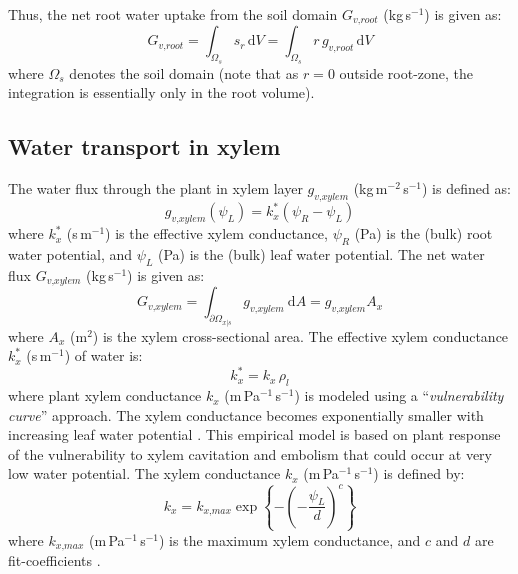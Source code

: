 Thus, the net root water uptake from the soil domain $G_{\textit{v,root}}$ (kg\,s$^{-1}$) is given as:
\begin{equation}
G_{\textit{v,root}} = \int_{\Omega_s} s_r\,\mathrm{d}V = \int_{\Omega_s} r\,g_{\textit{v,root}}\,\mathrm{d}V
\end{equation}
where $\Omega_s$ denotes the soil domain (note that as $r=0$ outside root-zone, the integration is essentially only in the root volume). 


\subsection{Water transport in xylem}

The water flux through the plant in xylem  layer $g_{\textit{v,xylem}}$ (kg\,m$^{-2}$\,s$^{-1}$) is defined as:
\begin{equation}
g_{\textit{v,xylem}}(\psi_L) = k_x^* \left(\psi_R - \psi_L\right)
\end{equation}
where $k_x^*$ (s\,m$^{-1}$) is the effective xylem conductance, $\psi_R$ (Pa) is the (bulk) root water potential, and $\psi_L$ (Pa) is the (bulk) leaf water potential. The net water flux $G_{\textit{v,xylem}}$ (kg\,s$^{-1}$) is given as:
\begin{equation}   
G_{\textit{v,xylem}} = \int_{\partial\Omega_{x|s}} g_{\textit{v,xylem}}~\mathrm{d}A = g_{\textit{v,xylem}} A_x
\label{eq:netwaterflux_xylem}
\end{equation}
where $A_x$ (m$^2$) is the xylem cross-sectional area. The effective xylem conductance $k_x^*$ (s\,m$^{-1}$) of water is:
\begin{equation}
k_x^* = k_x \, \rho_l
\end{equation}
where plant xylem conductance $k_x$ (m\,Pa$^{-1}$\,s$^{-1}$) is modeled using a ``\textit{vulnerability curve}'' approach. The xylem conductance becomes exponentially smaller with increasing leaf water potential \citep{Volpe2013}. This empirical model is based on plant response of the vulnerability to xylem cavitation and embolism that could occur at very low water potential. The xylem conductance $k_x$ (m\,Pa$^{-1}$\,s$^{-1}$) is defined by:
\begin{equation}
k_x = k_{\textit{x,max}} \exp \left\{ - \left( - \frac{\psi_L}{d}\right)^c \right\}
\end{equation}
where $k_{\textit{x,max}}$ (m\,Pa$^{-1}$\,s$^{-1}$) is the maximum xylem conductance, and $c$ and $d$ are fit-coefficients \citep{Volpe2013}.


